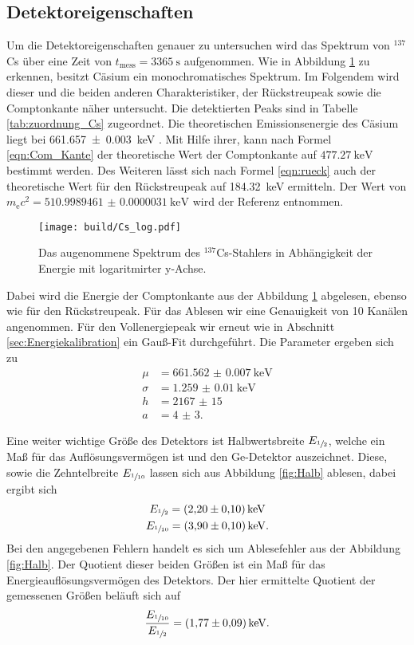 \subsection{Detektoreigenschaften}
\label{sec:Detektoreigenschaften}
Um die Detektoreigenschaften genauer zu untersuchen wird das Spektrum von ${}^{137}$Cs über eine Zeit
von $t_\text{mess} = \SI{3365}{\second}$ aufgenommen. Wie in Abbildung \ref{fig:Cs_log} zu erkennen, besitzt Cäsium
ein monochromatisches Spektrum. Im Folgendem wird dieser und die beiden anderen Charakteristiker, der Rückstreupeak
sowie die Comptonkante näher untersucht. Die detektierten Peaks sind in Tabelle \ref{tab:zuordnung_Cs} zugeordnet. 
Die theoretischen Emissionsenergie des Cäsium liegt bei \SI{661.657(3)}{\kilo\electronvolt} \cite{referenz1}. Mit Hilfe
ihrer, kann nach Formel \ref{eqn:Com_Kante} der theoretische Wert der Comptonkante auf $\SI{477.27}{\kilo\electronvolt}$
bestimmt werden. Des Weiteren lässt sich nach Formel \ref{eqn:rueck} auch der theoretische Wert für den Rückstreupeak
auf \SI{184.32}{\kilo\electronvolt} ermitteln. Der Wert von $m_\text{e} c^2 = \SI{510.9989461(31)}{\kilo\electronvolt}$ wird 
der Referenz \cite{codata} entnommen. 
\begin{figure}[htb]
 \centering
 \texttt{[image: build/Cs\_log.pdf]}
 \caption{Das augenommene Spektrum des ${}^{137}$Cs-Stahlers in Abhängigkeit der Energie mit logaritmirter y-Achse.}
 \label{fig:Cs_log}
\end{figure}

Dabei wird die Energie der Comptonkante aus der Abbildung \ref{fig:Cs_log} abgelesen, ebenso wie für den 
Rückstreupeak. Für das Ablesen wir eine Genauigkeit von \num{10} Kanälen angenommen.
Für den Vollenergiepeak wir erneut wie in Abschnitt \ref{sec:Energiekalibration} ein Gauß-Fit durchgeführt.
Die Parameter ergeben sich zu
\begin{align*}
  \mu &= \SI{661.562(7)}{\kilo\electronvolt} \\
  \sigma &= \SI{1.259(10)}{\kilo\electronvolt} \\
  h &= \num{2167(15)} \\
  a &= \num{4(3)}.
\end{align*}

Eine weiter wichtige Größe des Detektors ist Halbwertsbreite $E_{\sfrac{1}{2}}$, welche ein Maß für das Auflösungsvermögen ist
und den Ge-Detektor auszeichnet. Diese, sowie die Zehntelbreite $E_{\sfrac{1}{10}}$ lassen sich aus Abbildung \ref{fig:Halb} ablesen, 
dabei ergibt sich 
\begin{gather*}
  E_{\sfrac{1}{2}} = \SI{2.20(10)}{\kilo\electronvolt} \\
  E_{\sfrac{1}{10}} = \SI{3.90(10)}{\kilo\electronvolt}.
\end{gather*}
Bei den angegebenen Fehlern handelt es sich um Ablesefehler aus der Abbildung \ref{fig:Halb}.
Der Quotient dieser beiden Größen ist ein Maß für das Energieauflösungsvermögen des Detektors. Der hier ermittelte 
Quotient der gemessenen Größen beläuft sich auf
\begin{equation*}
  \frac{E_{\sfrac{1}{10}}}{E_{\sfrac{1}{2}}} = \SI{1.77(9)}{\kilo\electronvolt}.
\end{equation*}

